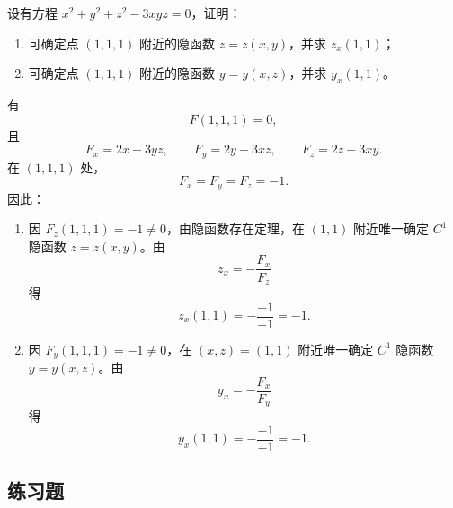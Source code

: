 \begin{xthought}[2]
设有方程 $x^2+y^2+z^2-3xyz=0$，证明：
  \begin{enumerate}[label=(\arabic*)]
    \item 可确定点 $(1,1,1)$ 附近的隐函数 $z=z(x,y)$，并求 $z_x(1,1)$；
    \item 可确定点 $(1,1,1)$ 附近的隐函数 $y=y(x,z)$，并求 $y_x(1,1)$。
  \end{enumerate}
\end{xthought}
\begin{xsolution}
有
\[
  F(1,1,1)=0,
\]
且
\[
  F_x=2x-3yz,\qquad F_y=2y-3xz,\qquad F_z=2z-3xy.
\]
在 $(1,1,1)$ 处，
\[
  F_x=F_y=F_z=-1.
\]
因此：
\begin{enumerate}[label=(\arabic*)]
  \item 因 $F_z(1,1,1)=-1\ne0$，由隐函数存在定理，在 $(1,1)$ 附近唯一确定 $C^1$ 隐函数 $z=z(x,y)$。由
  \[
    z_x=-\frac{F_x}{F_z}
  \]
  得
  \[
    z_x(1,1)=-\frac{-1}{-1}=-1.
  \]
  \item 因 $F_y(1,1,1)=-1\ne0$，在 $(x,z)=(1,1)$ 附近唯一确定 $C^1$ 隐函数 $y=y(x,z)$。由
  \[
    y_x=-\frac{F_x}{F_y}
  \]
  得
  \[
    y_x(1,1)=-\frac{-1}{-1}=-1.
  \]
\end{enumerate}
\end{xsolution}


\subsection{练习题}

